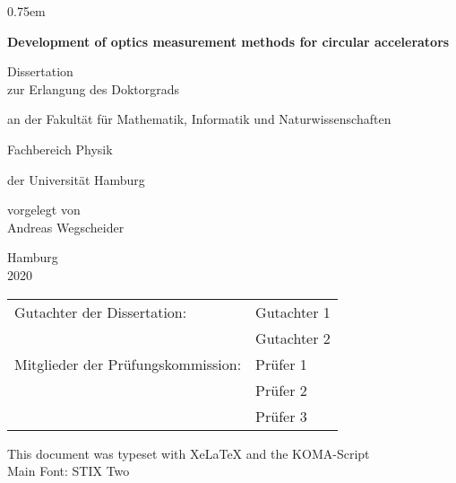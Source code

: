 \thispagestyle{empty}
\vspace{5cm}
\parskip0.75em
\begin{center}
    \Huge\bfseries
    Development of optics measurement methods for circular accelerators

    \vspace{3cm}
    \mdseries\Large
    Dissertation\\
    \vspace{1em}
    zur Erlangung des Doktorgrads

    an der Fakult\"at f\"ur Mathematik, Informatik und Naturwissenschaften
    
    Fachbereich Physik
    
    \vspace{1em}
    der Universit\"at Hamburg

    \vspace{2cm}
    \vfill
    vorgelegt von\\
    Andreas Wegscheider
    \vspace{2em}

    Hamburg\\
    2020
\end{center}
\cleardoublepage
{}

\thispagestyle{empty}
\renewcommand\baselinestretch{1.75}\selectfont
\begin{tabular}{ll}
   Gutachter der Dissertation: & Gutachter 1\\
    & Gutachter 2\\
   Mitglieder der Prüfungskommission: & Prüfer 1\\
   & Prüfer 2\\
   & Prüfer 3
\end{tabular}
\vfill
\renewcommand\baselinestretch{1}\selectfont
\noindent This document was typeset with XeLaTeX and the KOMA-Script\\
Main Font: STIX Two

\tableofcontents
\cleardoublepage
